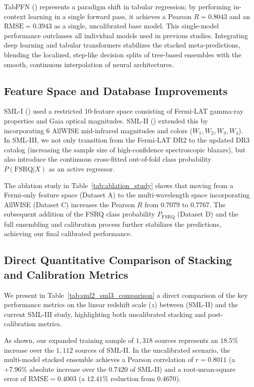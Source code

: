 \documentclass[twocolumn,linenumbers,floatfix]{aastex701}
\begin{document}
TabPFN (\citealt{Hollmann2022}) represents a paradigm shift in tabular regression; by performing in-context learning in a single forward pass, it achieves a Pearson $R = 0.8043$ and an $\text{RMSE} = 0.3943$ as a single, uncalibrated base model. This single-model performance outclasses all individual models used in previous studies. Integrating deep learning and tabular transformers stabilizes the stacked meta-predictions, blending the localized, step-like decision splits of tree-based ensembles with the smooth, continuous interpolation of neural architectures.

\subsection{Feature Space and Database Improvements}
SML-I (\citealt{Dainotti2021}) used a restricted 10-feature space consisting of Fermi-LAT gamma-ray properties and Gaia optical magnitudes. SML-II (\citealt{Narendra2022}) extended this by incorporating 6 AllWISE mid-infrared magnitudes and colors ($W_1, W_2, W_3, W_4$). In SML-III, we not only transition from the Fermi-LAT DR2 to the updated DR3 catalog (increasing the sample size of high-confidence spectroscopic blazars), but also introduce the continuous cross-fitted out-of-fold class probability $P(\text{FSRQ} | X)$ as an active regressor. 

The ablation study in Table~\ref{tab:ablation_study} shows that moving from a Fermi-only feature space (Dataset A) to the multi-wavelength space incorporating AllWISE (Dataset C) increases the Pearson $R$ from $0.7079$ to $0.7767$. The subsequent addition of the FSRQ class probability $P_{\mathrm{FSRQ}}$ (Dataset D) and the full ensembling and calibration process further stabilizes the predictions, achieving our final calibrated performance.

\subsection{Direct Quantitative Comparison of Stacking and Calibration Metrics}
We present in Table~\ref{tab:sml2_sml3_comparison} a direct comparison of the key performance metrics on the linear redshift scale ($z$) between \citealt{Narendra2022} (SML-II) and the current SML-III study, highlighting both uncalibrated stacking and post-calibration metrics. 

As shown, our expanded training sample of $1,318$ sources represents an $18.5\%$ increase over the $1,112$ sources of SML-II. In the uncalibrated scenario, the multi-model stacked ensemble achieves a Pearson correlation of $r = 0.8011$ (a $+7.96\%$ absolute increase over the $0.7420$ of SML-II) and a root-mean-square error of $\text{RMSE} = 0.4003$ (a $12.41\%$ reduction from $0.4670$).
\end{document}
